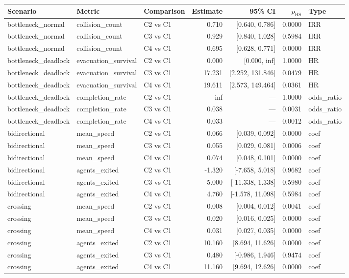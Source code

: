 \begin{tabular}{@{}lllrrrl@{}}
\toprule
\textbf{Scenario} & \textbf{Metric} & \textbf{Comparison} & \textbf{Estimate} & \textbf{95\% CI} & \textbf{$p_{\text{HS}}$} & \textbf{Type} \\
\midrule
bottleneck_normal & collision_count & C2 vs C1 & 0.710 & [0.640, 0.786] & 0.0000 & IRR \\
bottleneck_normal & collision_count & C3 vs C1 & 0.929 & [0.840, 1.028] & 0.5984 & IRR \\
bottleneck_normal & collision_count & C4 vs C1 & 0.695 & [0.628, 0.771] & 0.0000 & IRR \\
bottleneck_deadlock & evacuation_survival & C2 vs C1 & 0.000 & [0.000, inf] & 1.0000 & HR \\
bottleneck_deadlock & evacuation_survival & C3 vs C1 & 17.231 & [2.252, 131.846] & 0.0479 & HR \\
bottleneck_deadlock & evacuation_survival & C4 vs C1 & 19.611 & [2.573, 149.464] & 0.0361 & HR \\
bottleneck_deadlock & completion_rate & C2 vs C1 & inf & --- & 1.0000 & odds_ratio \\
bottleneck_deadlock & completion_rate & C3 vs C1 & 0.038 & --- & 0.0031 & odds_ratio \\
bottleneck_deadlock & completion_rate & C4 vs C1 & 0.033 & --- & 0.0012 & odds_ratio \\
bidirectional & mean_speed & C2 vs C1 & 0.066 & [0.039, 0.092] & 0.0000 & coef \\
bidirectional & mean_speed & C3 vs C1 & 0.055 & [0.029, 0.081] & 0.0006 & coef \\
bidirectional & mean_speed & C4 vs C1 & 0.074 & [0.048, 0.101] & 0.0000 & coef \\
bidirectional & agents_exited & C2 vs C1 & -1.320 & [-7.658, 5.018] & 0.9682 & coef \\
bidirectional & agents_exited & C3 vs C1 & -5.000 & [-11.338, 1.338] & 0.5980 & coef \\
bidirectional & agents_exited & C4 vs C1 & 4.760 & [-1.578, 11.098] & 0.5984 & coef \\
crossing & mean_speed & C2 vs C1 & 0.008 & [0.004, 0.012] & 0.0041 & coef \\
crossing & mean_speed & C3 vs C1 & 0.020 & [0.016, 0.025] & 0.0000 & coef \\
crossing & mean_speed & C4 vs C1 & 0.031 & [0.027, 0.035] & 0.0000 & coef \\
crossing & agents_exited & C2 vs C1 & 10.160 & [8.694, 11.626] & 0.0000 & coef \\
crossing & agents_exited & C3 vs C1 & 0.480 & [-0.986, 1.946] & 0.9474 & coef \\
crossing & agents_exited & C4 vs C1 & 11.160 & [9.694, 12.626] & 0.0000 & coef \\
\bottomrule
\end{tabular}